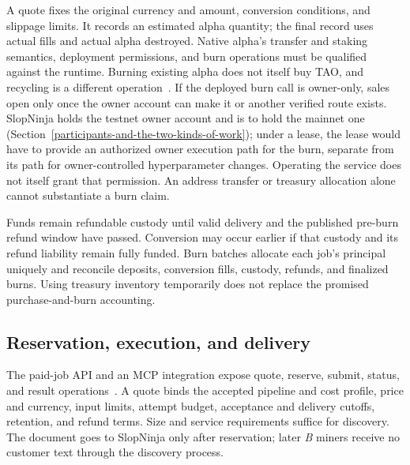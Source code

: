 A quote fixes the original currency and amount, conversion conditions, and
slippage limits. It records an estimated alpha quantity; the final record uses
actual fills and actual alpha destroyed. Native alpha's transfer and staking
semantics, deployment permissions, and burn operations must be qualified
against the runtime. Burning existing alpha does not itself buy TAO, and
recycling is a different operation~\cite{stakeburn,alphaburnimplementation}.
If the deployed burn call is owner-only, sales open only once the owner
account can make it or another verified route exists. SlopNinja holds the
testnet owner account and is to hold the mainnet one
(Section~\ref{participants-and-the-two-kinds-of-work}); under a lease, the lease
would have to provide an authorized owner execution path for the burn,
separate from its path for owner-controlled hyperparameter changes. Operating
the service does not itself grant that permission.
An address transfer or treasury allocation
alone cannot substantiate a burn claim.

Funds remain refundable custody until valid delivery and the published
pre-burn refund window have passed. Conversion may occur earlier if that
custody and its refund liability remain fully funded. Burn batches allocate
each job's principal uniquely and reconcile deposits, conversion fills,
custody, refunds, and finalized burns. Using treasury inventory temporarily
does not replace the promised purchase-and-burn accounting.

\subsection{Reservation, execution, and delivery}\label{reservation-and-delivery}
\label{application-and-agent-integration}

The paid-job API and an MCP integration expose quote, reserve, submit, status, and
result operations~\cite{mcp2026}. A quote binds the accepted pipeline and cost
profile, price and currency, input limits, attempt budget, acceptance and
delivery cutoffs, retention, and refund terms. Size and service requirements
suffice for discovery. The document goes to SlopNinja only after reservation;
later \textit{B} miners receive no customer text through the discovery process.

